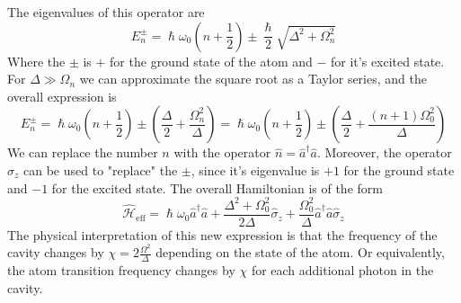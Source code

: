 The eigenvalues of this operator are
\[
    E_n^\pm = \hslash \omega_0 (n + \frac{1}{2}) \pm \frac{\hslash}{2}\sqrt{\Delta^2 +\Omega_n^2}
\]
Where the $\pm$ is $+$ for the ground state of the atom and $-$ for it's excited state. For $\Delta \gg \Omega_n$ we can approximate the square root as a Taylor series, and the overall expression is
\[
    E_n^\pm = \hslash \omega_0 (n + \frac{1}{2}) \pm (\frac{\Delta}{2} + \frac{\Omega_n^2}{\Delta}) =  \hslash \omega_0 (n + \frac{1}{2}) \pm (\frac{\Delta}{2} + \frac{ (n+1)\Omega_0^2}{\Delta})
\]
We can replace the number $n$ with the operator $\hat{n} = \hat{a}^\dag \hat{a}$. Moreover, the operator $\hat{\sigma}_z$ can be used to "replace" the $\pm$, since it's eigenvalue is $+1$ for the ground state and $-1$ for the excited state. The overall Hamiltonian is of the form
\begin{equation} \label{eq:dispersive-hamiltonian}
    \hat{\mathcal{H}}_{\text{eff}} = \hslash \omega_0 \hat{a}^\dag \hat{a} + \frac{\Delta^2 + \Omega_0^2}{2\Delta}\hat{\sigma}_z + \frac{\Omega_0^2}{\Delta} \hat{a}^\dag \hat{a} \hat{\sigma}_z
\end{equation}
The physical interpretation of this new expression is that the frequency of the cavity changes by $\chi = 2\frac{\Omega^2}{\Delta}$ depending on the state of the atom. Or equivalently, the atom transition frequency changes by $\chi$ for each additional photon in the cavity.



